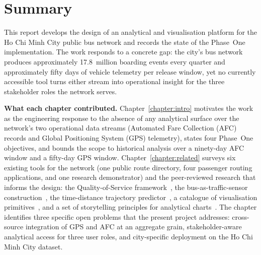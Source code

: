 \section{Summary}
\label{sec:conclusion:summary}

This report develops the design of an analytical and visualisation
platform for the Ho Chi Minh City public bus network and records the
state of the Phase~One implementation. The work responds to a concrete
gap: the city's bus network produces approximately 17.8~million
boarding events every quarter and approximately fifty days of vehicle
telemetry per release window, yet no currently accessible tool turns
either stream into operational insight for the three stakeholder
roles the network serves.

\medskip
\noindent\textbf{What each chapter contributed.}
Chapter~\ref{chapter:intro} motivates the work as the engineering
response to the absence of any analytical surface over the network's
two operational data streams (Automated Fare Collection (AFC) records
and Global Positioning System (GPS) telemetry), states four Phase~One
objectives, and bounds the scope to historical analysis over a
ninety-day AFC window and a fifty-day GPS window.
Chapter~\ref{chapter:related} surveys six existing tools for the
network (one public route directory, four passenger routing
applications, and one research demonstrator) and the peer-reviewed
research that informs the design: the Quality-of-Service
framework~\cite{srisakaokul2023}, the bus-as-traffic-sensor
construction~\cite{derevitskiy2016}, the time-distance trajectory
predictor~\cite{linzeng2014}, a catalogue of visualisation
primitives~\cite{liu2022}, and a set of storytelling principles for
analytical charts~\cite{knaflic2015}. The chapter identifies three specific
open problems that the present project addresses: cross-source
integration of GPS and AFC at an aggregate grain, stakeholder-aware
analytical access for three user roles, and city-specific deployment
on the Ho Chi Minh City dataset.

